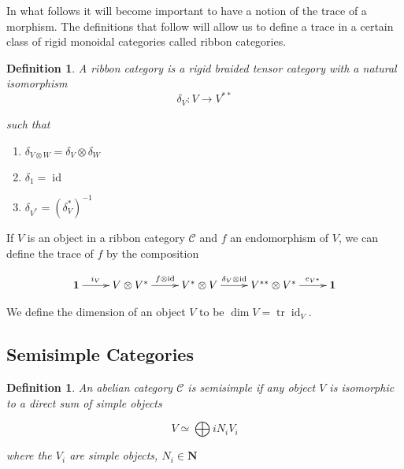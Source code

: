 \documentclass[]{article}
\newtheorem{defn}[theorem]{Definition}
\newcommand{\tr}{\operatorname{tr}}
\newcommand{\id}{\operatorname{id}}
\numberwithin{equation}{subsection}
\begin{document}
In what follows it will become important to have a notion of the trace of a
morphism. The definitions that follow will allow us to define a trace in a
certain class of rigid monoidal categories called ribbon categories.

\begin{defn}

    A \emph{ribbon category} is a rigid braided tensor category with a natural isomorphism
    \begin{equation}
        \delta_V: V \to V^{**}
    \end{equation}

such that 
\begin{enumerate}
    \renewcommand{\labelenumi}{\roman{enumi})}

    \item $\delta_{V \otimes W} = \delta_V \otimes \delta_W$
    \item $\delta_1 = \id$
    \item $\delta_{V^*} = (\delta_V^*)^{-1}$
\end{enumerate}

\end{defn}

If $V$ is an object in a ribbon category $\mathcal{C}$ and $f$ an endomorphism of $V$, we can define the trace of $f$ by the composition

\begin{equation}
    \xymatrix{
    \mathbf{1} \ar[r]^-{i_V} & V \otimes V^* \ar[r]^-{f \otimes \id} & V^* \otimes V \ar[r]^-{\delta_V \otimes \id} & V^{**} \otimes V^* \ar[r]^-{e_{V^*}} & 
    \mathbf{1}
    }
\end{equation}

We define the dimension of an object $V$ to be $\dim V = \tr \id_V$.

\subsection{Semisimple Categories}
\begin{defn}
    An abelian category $\mathcal{C}$ is \emph{semisimple} if any object $V$ is isomorphic to a direct sum of simple objects

    \begin{equation}
        V \simeq \bigoplus{i} N_i V_i
    \end{equation}

    where the $V_i$ are simple objects, $N_i \in \mathbf{N}$

\end{defn}
\end{document}
